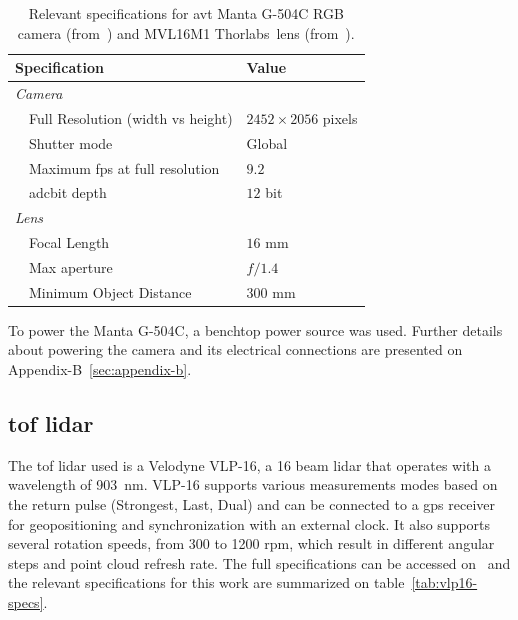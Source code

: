 \begin{table}[!ht]
	\renewcommand{\arraystretch}{1.2}
	\centering
	\begin{tabular}{@{}lp{7cm}l@{}}
		\toprule
		\multicolumn{2}{l}{Specification} & Value \\ \midrule
		\multicolumn{2}{l}{\emph{Camera}} & \\
		\phantom{a} & Full Resolution (width vs height) & $2452 \times 2056$ pixels \\
									& Shutter mode & Global \\
									&	Maximum \ac{fps} at full resolution & $9.2$ \\ 
									& \acs{adc}\footnotemark bit depth & $12$ bit \\\midrule 
									\multicolumn{2}{l}{\emph{Lens}} \\
									&	Focal Length & $16$ mm \\
									&	Max aperture & $f/1.4$ \\
									&	Minimum Object Distance & $300$ mm  \\
		\bottomrule
	\end{tabular}
	\caption{Relevant specifications for \ac{avt} Manta G-504C RGB camera (from~\cite{MantaG504C})  and MVL16M1 Thorlabs\cp~lens (from~\cite{Thorlabs}).}
	\label{tab:camera-and-lens-specs}
\end{table}


To power the Manta G-504C, a benchtop power source was used. Further details about powering the camera and its electrical connections are presented on Appendix-B~\ref{sec:appendix-b}.

\subsection{\ac{tof} \ac{lidar}}
The \ac{tof} \ac{lidar} used is a Velodyne VLP-16\texttrademark, a 16 beam \ac{lidar} that operates with a wavelength of \SI{903}{\nano\meter}. VLP-16 supports various measurements modes based on the return pulse (Strongest, Last, Dual) and can be connected to a \ac{gps} receiver for geopositioning and synchronization with an external clock. It also supports several rotation speeds, from 300 to 1200 \ac{rpm}, which result in different angular steps and point cloud refresh rate. The full specifications can be accessed on~\cite{VLP16} and the relevant specifications for this work are summarized on table~\ref{tab:vlp16-specs}.

